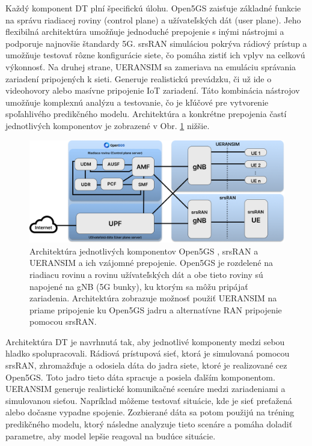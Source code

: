 \par{
Každý komponent DT plní špecifickú úlohu. Open5GS zaisťuje základné funkcie na správu riadiacej roviny (control plane) a užívateľských dát (user plane). Jeho flexibilná architektúra umožňuje jednoduché prepojenie s inými nástrojmi a podporuje najnovšie štandardy 5G. srsRAN simuláciou pokrýva rádiový prístup a umožňuje testovať rôzne konfigurácie siete, čo pomáha zistiť ich vplyv na celkovú výkonnosť. Na druhej strane, UERANSIM sa zameriava na emuláciu správania zariadení pripojených k sieti. Generuje realistickú prevádzku, či už ide o videohovory alebo masívne pripojenie IoT zariadení. Táto kombinácia nástrojov umožňuje komplexnú analýzu a testovanie, čo je kľúčové pre vytvorenie spoľahlivého predikčného modelu. Architektúra a konkrétne prepojenia častí jednotlivých komponentov je zobrazené v Obr. \ref{fig:architecture} nižšie.
}
\newline
\begin{figure}[H]
    \centering
    \includegraphics[width=0.75\linewidth]{assets/images/open5gs+ueran.png}
    \caption[Architektúra komponentov Open5GS, srsRAN a UERANSIM]{Architektúra jednotlivých komponentov Open5GS \cite{open5gs}, srsRAN a UERANSIM a ich vzájomné prepojenie. Open5GS je rozdelené na riadiacu rovinu a rovinu užívateľských dát a obe tieto roviny sú napojené na gNB (5G bunky), ku ktorým sa môžu pripájať zariadenia. Architektúra zobrazuje možnosť použiť UERANSIM na priame pripojenie ku Open5GS jadru a alternatívne RAN pripojenie pomocou srsRAN.}
    \label{fig:architecture}
\end{figure}

\par{
Architektúra DT je navrhnutá tak, aby jednotlivé komponenty medzi sebou hladko spolupracovali. Rádiová prístupová sieť, ktorá je simulovaná pomocou srsRAN, zhromažďuje a odosiela dáta do jadra siete, ktoré je realizované cez Open5GS. Toto jadro tieto dáta spracuje a posiela ďalším komponentom. UERANSIM generuje realistické komunikačné scenáre medzi zariadeniami a simulovanou sieťou. Napríklad môžeme testovať situácie, kde je sieť preťažená alebo dočasne vypadne spojenie. Zozbierané dáta sa potom použijú na tréning predikčného modelu, ktorý následne analyzuje tieto scenáre a pomáha doladiť parametre, aby model lepšie reagoval na budúce situácie.
}

